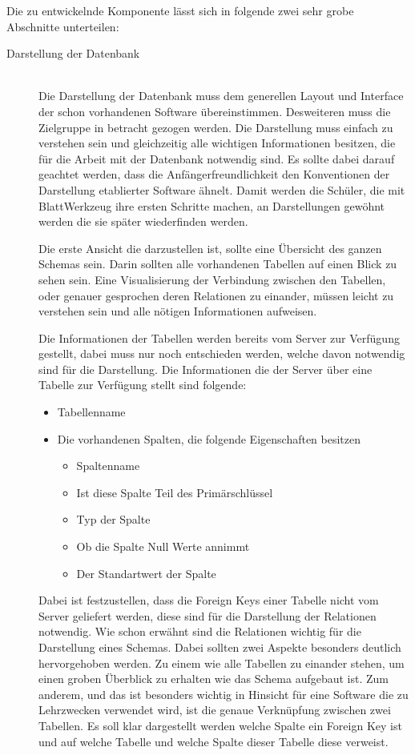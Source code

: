 Die zu entwickelnde Komponente lässt sich in folgende zwei sehr grobe Abschnitte unterteilen:
\begin{description}

\item[Darstellung der Datenbank] \hfill\\
Die Darstellung der Datenbank muss dem generellen Layout und Interface der schon vorhandenen Software übereinstimmen. Desweiteren muss die Zielgruppe in betracht gezogen werden. Die Darstellung muss einfach zu verstehen sein und gleichzeitig alle wichtigen Informationen besitzen, die für die Arbeit mit der Datenbank notwendig sind.
Es sollte dabei darauf geachtet werden, dass die Anfängerfreundlichkeit den Konventionen der Darstellung etablierter Software ähnelt. Damit werden die Schüler, die mit BlattWerkzeug ihre ersten Schritte machen, an Darstellungen gewöhnt werden die sie später wiederfinden werden.

Die erste Ansicht die darzustellen ist, sollte eine Übersicht des ganzen Schemas sein. Darin sollten alle vorhandenen Tabellen auf einen Blick zu sehen sein. Eine Visualisierung der Verbindung zwischen den Tabellen, oder genauer gesprochen deren Relationen zu einander, müssen leicht zu verstehen sein und alle nötigen Informationen aufweisen. 

Die Informationen der Tabellen werden bereits vom Server zur Verfügung gestellt, dabei muss nur noch entschieden werden, welche davon notwendig sind für die Darstellung. Die Informationen die der Server über eine Tabelle zur Verfügung stellt sind folgende:
\begin{itemize}
\item Tabellenname
\item Die vorhandenen Spalten, die folgende Eigenschaften besitzen
    \begin{itemize}
    \item Spaltenname
    \item Ist diese Spalte Teil des Primärschlüssel
    \item Typ der Spalte
    \item Ob die Spalte Null Werte annimmt
    \item Der Standartwert der Spalte
    \end{itemize}
\end{itemize}

Dabei ist festzustellen, dass die Foreign Keys einer Tabelle nicht vom Server geliefert werden, diese sind für die Darstellung der Relationen notwendig.
Wie schon erwähnt sind die Relationen wichtig für die Darstellung eines Schemas. Dabei sollten zwei Aspekte besonders deutlich hervorgehoben werden.
Zu einem wie alle Tabellen zu einander stehen, um einen groben Überblick zu erhalten wie das Schema aufgebaut ist. Zum anderem, und das ist besonders wichtig in Hinsicht für eine Software die zu Lehrzwecken verwendet wird, ist die genaue Verknüpfung zwischen zwei Tabellen. Es soll klar dargestellt werden welche Spalte ein Foreign Key ist und auf welche Tabelle und welche Spalte dieser Tabelle diese verweist.


\end{description}
